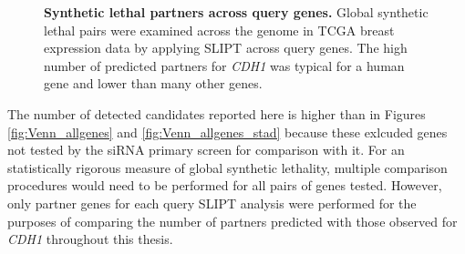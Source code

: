 \begin{figure}[!ht]
\begin{mdframed}
  \begin{center}
   \end{center}
   \caption[Synthetic lethal partners across query genes]{\small \textbf{Synthetic lethal partners across query genes.} Global synthetic lethal pairs were examined across the genome in TCGA breast expression data by applying SLIPT across query genes. The high number of predicted partners for \textit{CDH1} was typical for a human gene and lower than many other genes.
   }
\label{fig:global_SL}
\end{mdframed}
\end{figure}

The number of detected candidates reported here is higher than in Figures \ref{fig:Venn_allgenes} and \ref{fig:Venn_allgenes_stad} because these exlcuded genes not tested by the siRNA primary screen \citep{Telford2015} for comparison with it. For an statistically rigorous measure of global synthetic lethality, multiple comparison procedures would need to be performed for all pairs of genes tested. However, only partner genes for each query SLIPT analysis were performed for the purposes of comparing the number of partners predicted with those observed for \textit{CDH1} throughout this thesis.


